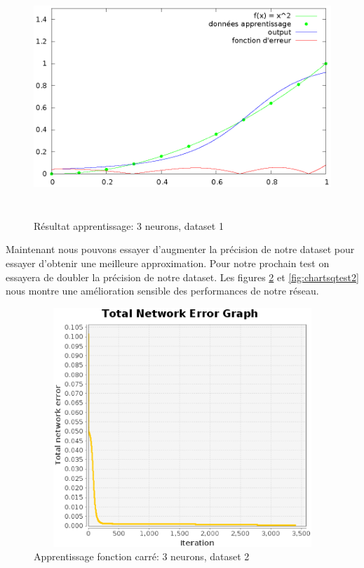 \documentclass[twoside,openright,a4paper,11pt,french]{article}
\begin{document}
\begin{figure}[ht]
\centering
\includegraphics[width=12cm,height=9cm]{./pics/chartsqtest1.eps}
\caption{Résultat apprentissage: 3 neurons, dataset 1}
\label{fig:chartsqtest1}
\end{figure}

Maintenant nous pouvons essayer d'augmenter la précision de notre dataset
pour essayer d'obtenir une meilleure approximation. Pour notre 
prochain test on essayera de doubler la précision de notre dataset.
Les figures \ref{fig:sqtest2} et \ref{fig:chartsqtest2} nous montre 
une amélioration sensible des performances de notre réseau. 



\begin{figure}[ht]
\centering
\includegraphics[width=12cm,height=9cm]{./pics/sqtest2.eps}
\caption{Apprentissage fonction carré: 3 neurons, dataset 2}
\label{fig:sqtest2}
\end{figure}
\end{document}
